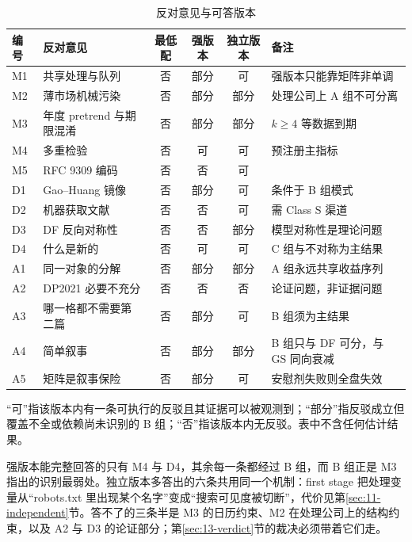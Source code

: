 \documentclass[a4paper,11pt]{ctexart}
\begin{document}
\begin{table}[htbp]
\centering
\begin{threeparttable}
\caption{反对意见与可答版本}\label{tab:12-boundary}
\begin{tabular}{@{}lp{4.6cm}cccp{4.2cm}@{}}
\toprule
编号 & 反对意见 & 最低配 & 强版本 & 独立版本 & 备注 \\
\midrule
M1 & 共享处理与队列 & 否 & 部分 & 可 & 强版本只能靠矩阵非单调 \\
M2 & 薄市场机械污染 & 否 & 部分 & 部分 & 处理公司上 A 组不可分离 \\
M3 & 年度 pretrend 与期限混淆 & 否 & 部分 & 部分 & $k\ge 4$ 等数据到期 \\
M4 & 多重检验 & 否 & 可 & 可 & 预注册主指标 \\
M5 & RFC 9309 编码 & 否 & 否 & 可 & \\
D1 & Gao--Huang 镜像 & 否 & 部分 & 可 & 条件于 B 组模式 \\
D2 & 机器获取文献 & 否 & 否 & 可 & 需 Class S 渠道 \\
D3 & DF 反向对称性 & 否 & 否 & 部分 & 模型对称性是理论问题 \\
D4 & 什么是新的 & 否 & 可 & 可 & C 组与不对称为主结果 \\
A1 & 同一对象的分解 & 否 & 部分 & 部分 & A 组永远共享收益序列 \\
A2 & DP2021 必要不充分 & 否 & 否 & 否 & 论证问题，非证据问题 \\
A3 & 哪一格都不需要第二篇 & 否 & 部分 & 可 & B 组须为主结果 \\
A4 & 简单叙事 & 否 & 部分 & 部分 & B 组只与 DF 可分，与 GS 同向衰减 \\
A5 & 矩阵是叙事保险 & 否 & 部分 & 可 & 安慰剂失败则全盘失效 \\
\bottomrule
\end{tabular}
\begin{tablenotes}\footnotesize
\item “可”指该版本内有一条可执行的反驳且其证据可以被观测到；“部分”指反驳成立但覆盖不全或依赖尚未识别的 B 组；“否”指该版本内无反驳。表中不含任何估计结果。
\end{tablenotes}
\end{threeparttable}
\end{table}

强版本能完整回答的只有 M4 与 D4，其余每一条都经过 B 组，而 B 组正是 M3 指出的识别最弱处。独立版本多答出的六条共用同一个机制：first stage 把处理变量从“robots.txt 里出现某个名字”变成“搜索可见度被切断”，代价见第\ref{sec:11-independent}节。答不了的三条半是 M3 的日历约束、M2 在处理公司上的结构约束，以及 A2 与 D3 的论证部分；第\ref{sec:13-verdict}节的裁决必须带着它们走。
\clearpage
\end{document}

